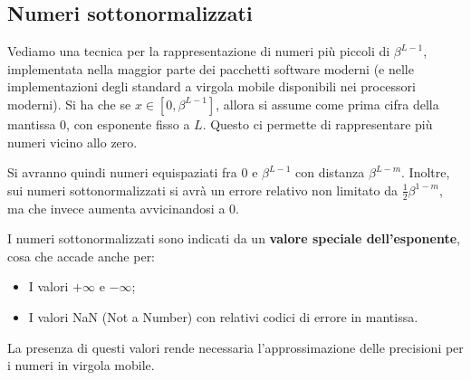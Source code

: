 \documentclass[a4paper,11pt]{article}
\begin{document}
\subsection{Numeri sottonormalizzati}
Vediamo una tecnica per la rappresentazione di numeri più piccoli di $\beta^{L - 1}$, implementata nella maggior parte dei pacchetti software moderni (e nelle implementazioni degli standard a virgola mobile disponibili nei processori moderni).
Si ha che se $x \in [0, \beta^{L - 1}]$, allora si assume come prima cifra della mantissa $0$, con esponente fisso a $L$. 
Questo ci permette di rappresentare più numeri vicino allo zero. 

Si avranno quindi numeri equispaziati fra 0 e $\beta^{L - 1}$ con distanza $\beta^{L - m}$.
Inoltre, sui numeri sottonormalizzati si avrà un errore relativo non limitato da $\frac{1}{2} \beta^{1 - m}$, ma che invece aumenta avvicinandosi a 0. 

I numeri sottonormalizzati sono indicati da un \textbf{valore speciale dell'esponente}, cosa che accade anche per:
\begin{itemize}
	\item I valori $+\infty$ e $-\infty$;
	\item I valori NaN (Not a Number) con relativi codici di errore in mantissa.
\end{itemize}

La presenza di questi valori rende necessaria l'approssimazione delle precisioni per i numeri in virgola mobile.
\end{document}
